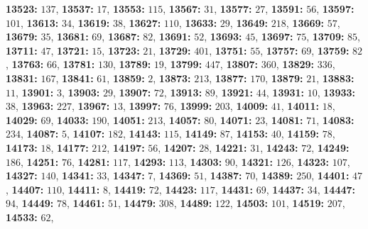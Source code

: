 \textsf{\bfseries 13523:} $137$, \textsf{\bfseries 13537:} $17$, \textsf{\bfseries 13553:} $115$, \textsf{\bfseries 13567:} $31$, \textsf{\bfseries 13577:} $27$, \textsf{\bfseries 13591:} $56$, \textsf{\bfseries 13597:} $101$, \textsf{\bfseries 13613:} $34$, \textsf{\bfseries 13619:} $38$, \textsf{\bfseries 13627:} $110$, \textsf{\bfseries 13633:} $29$, \textsf{\bfseries 13649:} $218$, \textsf{\bfseries 13669:} $57$, \textsf{\bfseries 13679:} $35$, \textsf{\bfseries 13681:} $69$, \textsf{\bfseries 13687:} $82$, \textsf{\bfseries 13691:} $52$, \textsf{\bfseries 13693:} $45$, \textsf{\bfseries 13697:} $75$, \textsf{\bfseries 13709:} $85$, \textsf{\bfseries 13711:} $47$, \textsf{\bfseries 13721:} $15$, \textsf{\bfseries 13723:} $21$, \textsf{\bfseries 13729:} $401$, \textsf{\bfseries 13751:} $55$, \textsf{\bfseries 13757:} $69$, \textsf{\bfseries 13759:} $82$, \textsf{\bfseries 13763:} $66$, \textsf{\bfseries 13781:} $130$, \textsf{\bfseries 13789:} $19$, \textsf{\bfseries 13799:} $447$, \textsf{\bfseries 13807:} $360$, \textsf{\bfseries 13829:} $336$, \textsf{\bfseries 13831:} $167$, \textsf{\bfseries 13841:} $61$, \textsf{\bfseries 13859:} $2$, \textsf{\bfseries 13873:} $213$, \textsf{\bfseries 13877:} $170$, \textsf{\bfseries 13879:} $21$, \textsf{\bfseries 13883:} $11$, \textsf{\bfseries 13901:} $3$, \textsf{\bfseries 13903:} $29$, \textsf{\bfseries 13907:} $72$, \textsf{\bfseries 13913:} $89$, \textsf{\bfseries 13921:} $44$, \textsf{\bfseries 13931:} $10$, \textsf{\bfseries 13933:} $38$, \textsf{\bfseries 13963:} $227$, \textsf{\bfseries 13967:} $13$, \textsf{\bfseries 13997:} $76$, \textsf{\bfseries 13999:} $203$, \textsf{\bfseries 14009:} $41$, \textsf{\bfseries 14011:} $18$, \textsf{\bfseries 14029:} $69$, \textsf{\bfseries 14033:} $190$, \textsf{\bfseries 14051:} $213$, \textsf{\bfseries 14057:} $80$, \textsf{\bfseries 14071:} $23$, \textsf{\bfseries 14081:} $71$, \textsf{\bfseries 14083:} $234$, \textsf{\bfseries 14087:} $5$, \textsf{\bfseries 14107:} $182$, \textsf{\bfseries 14143:} $115$, \textsf{\bfseries 14149:} $87$, \textsf{\bfseries 14153:} $40$, \textsf{\bfseries 14159:} $78$, \textsf{\bfseries 14173:} $18$, \textsf{\bfseries 14177:} $212$, \textsf{\bfseries 14197:} $56$, \textsf{\bfseries 14207:} $28$, \textsf{\bfseries 14221:} $31$, \textsf{\bfseries 14243:} $72$, \textsf{\bfseries 14249:} $186$, \textsf{\bfseries 14251:} $76$, \textsf{\bfseries 14281:} $117$, \textsf{\bfseries 14293:} $113$, \textsf{\bfseries 14303:} $90$, \textsf{\bfseries 14321:} $126$, \textsf{\bfseries 14323:} $107$, \textsf{\bfseries 14327:} $140$, \textsf{\bfseries 14341:} $33$, \textsf{\bfseries 14347:} $7$, \textsf{\bfseries 14369:} $51$, \textsf{\bfseries 14387:} $70$, \textsf{\bfseries 14389:} $250$, \textsf{\bfseries 14401:} $47$, \textsf{\bfseries 14407:} $110$, \textsf{\bfseries 14411:} $8$, \textsf{\bfseries 14419:} $72$, \textsf{\bfseries 14423:} $117$, \textsf{\bfseries 14431:} $69$, \textsf{\bfseries 14437:} $34$, \textsf{\bfseries 14447:} $94$, \textsf{\bfseries 14449:} $78$, \textsf{\bfseries 14461:} $51$, \textsf{\bfseries 14479:} $308$, \textsf{\bfseries 14489:} $122$, \textsf{\bfseries 14503:} $101$, \textsf{\bfseries 14519:} $207$, \textsf{\bfseries 14533:} $62$, 
